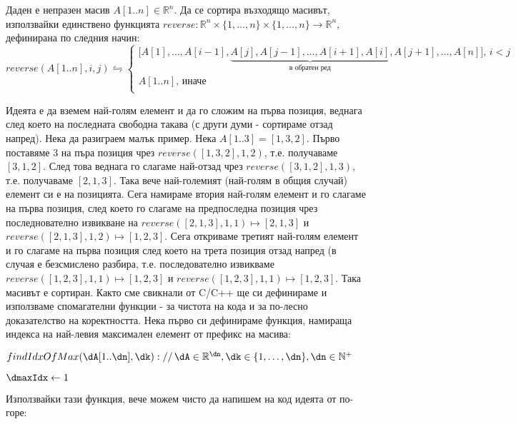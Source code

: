 \begin{problem}
	Даден е непразен масив $A[1..n]\in\mathbb{R}^n$. Да се сортира възходящо масивът, използвайки единствено функцията $reverse\!:\!\mathbb{R}^n\!\times\!\{1,\dots,n\}\!\times\!\{1,\dots,n\}\!\to\!\mathbb{R}^n$, дефинирана по следния начин:
	\begin{equation*}
		reverse(A[1..n],i,j)\leftrightharpoons\begin{cases}
			\big[A[1],\dots,A[i-1],\underbrace{A[j],A[j-1],\dots,A[i+1],A[i]}_{\text{в обратен ред}},A[j+1],\dots,A[n]\big],\, i<j\\
			A[1..n],\, \text{иначе}\\
		\end{cases}
	\end{equation*}
\end{problem}
\begin{solution}
	Идеята е да вземем най-голям елемент и да го сложим на първа позиция, веднага след което на последната свободна такава (с други думи - сортираме отзад напред). Нека да разиграем малък пример. Нека $A[1..3]=[1,3,2]$. Първо поставяме $3$ на пъра позиция чрез $reverse([1,3,2],1,2)$, т.е. получаваме $[3,1,2]$. След това веднага го слагаме най-отзад чрез $reverse([3,1,2],1,3)$, т.е. получаваме $[2,1,3]$. Така вече най-големият (най-голям в общия случай) елемент си е на позицията. Сега намираме втория най-голям елемент и го слагаме на първа позиция, след което го слагаме на предпоследна позиция чрез последнователно извикване на $reverse([2,1,3],1,1)\mapsto[2,1,3]$ и $reverse([2,1,3],1,2)\mapsto[1,2,3]$. Сега откриваме третият най-голям елемент и го слагаме на първа позиция след което на трета позиция отзад напред (в случая е безсмислено разбира, т.е. последователно извикваме $reverse([1,2,3],1,1)\mapsto[1,2,3]$ и $reverse([1,2,3],1,1)\mapsto[1,2,3]$. Така масивът е сортиран. Както сме свикнали от C/C++ ще си дефинираме и използваме спомагателни функции - за чистота на кода и за по-лесно доказателство на коректността. Нека първо си дефинираме функция, намираща индекса на най-левия максимален елемент от префикс на масива:
	\begin{pseudocode}
		
		$findIdxOfMax(\dA[1..\dn],\dk)://\,\dA\in\mathbb{R}^{\dn},\dk\in\{1,\dots,\dn\},\dn\in\mathbb{N}^+$
		\Mybegin
		{
			$\dmaxIdx\leftarrow1$\;
			
			{
				\If{$\dA[\di]>\dA[\dmaxIdx]$}{$\dmaxIdx\leftarrow\di$\;}
			}
			\KwRet{$\dmaxIdx$\;}
		}
	\end{pseudocode}
	Използвайки тази функция, вече можем чисто да напишем на код идеята от по-горе:
	\begin{pseudocode}
		\SetKwData{dA}{A}
		\SetKwData{dn}{n}
		\SetKwData{dmaxIdx}{maxIdx}
		\SetKwData{dk}{k}
		

\end{pseudocode}
\end{solution}
